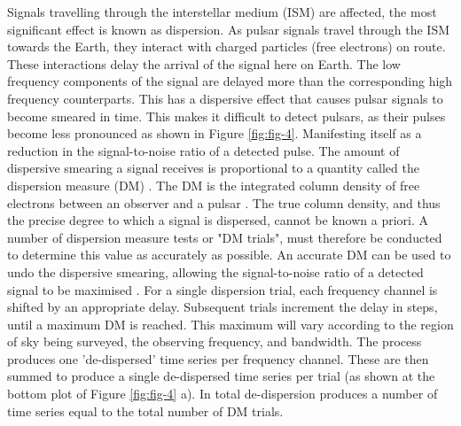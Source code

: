 Signals travelling through the interstellar medium (ISM) are affected, the most significant effect is known as dispersion. As pulsar signals travel through the ISM towards the Earth, they interact with charged particles (free electrons) on route. These interactions delay the arrival of the signal here on Earth. The low frequency components of the signal are delayed more than the corresponding high frequency counterparts. This has a dispersive effect that causes pulsar signals to become smeared in time. This makes it difficult to detect pulsars, as their pulses become less pronounced as shown in Figure \ref{fig:fig-4}. Manifesting itself as a reduction in the signal-to-noise ratio of a detected pulse. The amount of dispersive smearing a signal receives is proportional to a quantity called the dispersion measure (DM) \citep{lorimer}. The DM is the integrated column density of free electrons between an observer and a pulsar \citep{lorimer2008}. The true column density, and thus the precise degree to which a signal is dispersed, cannot be known a priori. A number of dispersion measure tests or "DM trials", must therefore be conducted to determine this value as accurately as possible. An accurate DM can be used to undo the dispersive smearing, allowing the signal-to-noise ratio of a detected signal to be maximised \citep{lorimer}. For a single dispersion trial, each frequency channel is shifted by an appropriate delay. Subsequent trials increment the delay in steps, until a maximum DM is reached. This maximum will vary according to the region of sky being surveyed, the observing frequency, and bandwidth. The process produces one 'de-dispersed' time series per frequency channel. These are then summed to produce a single de-dispersed time series per trial (as shown at the bottom plot of Figure \ref{fig:fig-4} a). In total de-dispersion produces a number of time series equal to the total number of DM trials.

